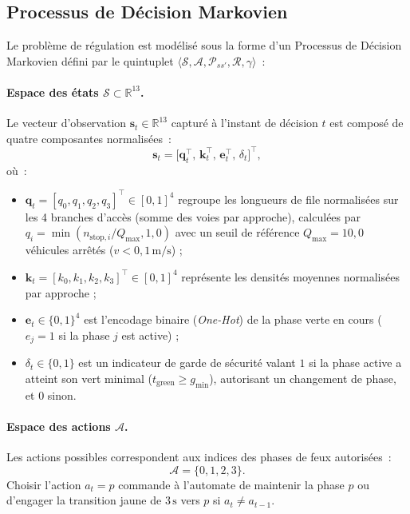 \documentclass[11pt,a4paper]{article}
\begin{document}
\subsection{Processus de Décision Markovien}
Le problème de régulation est modélisé sous la forme d'un Processus de Décision Markovien défini par le quintuplet $\langle \mathcal{S}, \mathcal{A}, \mathcal{P}_{ss'}, \mathcal{R}, \gamma \rangle$~:

\paragraph{Espace des états $\mathcal{S} \subset \mathbb{R}^{13}$.}
Le vecteur d'observation $\mathbf{s}_t \in \mathbb{R}^{13}$ capturé à l'instant de décision $t$ est composé de quatre composantes normalisées~:
\begin{equation}
\mathbf{s}_t = \big[ \mathbf{q}_t^{\top}, \, \mathbf{k}_t^{\top}, \, \mathbf{e}_t^{\top}, \, \delta_t \big]^{\top},
\end{equation}
où~:
\begin{itemize}[nosep]
    \item $\mathbf{q}_t = [q_0, q_1, q_2, q_3]^{\top} \in [0, 1]^4$ regroupe les longueurs de file normalisées sur les 4 branches d'accès (somme des voies par approche), calculées par $q_i = \min(n_{\text{stop}, i} / Q_{\max}, 1{,}0)$ avec un seuil de référence $Q_{\max} = 10{,}0$ véhicules arrêtés ($v < 0{,}1\,\mathrm{m/s}$) ;
    \item $\mathbf{k}_t = [k_0, k_1, k_2, k_3]^{\top} \in [0, 1]^4$ représente les densités moyennes normalisées par approche ;
    \item $\mathbf{e}_t \in \{0, 1\}^4$ est l'encodage binaire (\emph{One-Hot}) de la phase verte en cours ($e_j = 1$ si la phase $j$ est active) ;
    \item $\delta_t \in \{0, 1\}$ est un indicateur de garde de sécurité valant $1$ si la phase active a atteint son vert minimal ($t_{\text{green}} \ge g_{\min}$), autorisant un changement de phase, et $0$ sinon.
\end{itemize}

\paragraph{Espace des actions $\mathcal{A}$.}
Les actions possibles correspondent aux indices des phases de feux autorisées~:
\begin{equation}
\mathcal{A} = \{0, 1, 2, 3\}.
\end{equation}
Choisir l'action $a_t = p$ commande à l'automate de maintenir la phase $p$ ou d'engager la transition jaune de $3\,\mathrm{s}$ vers $p$ si $a_t \neq a_{t-1}$.
\end{document}
